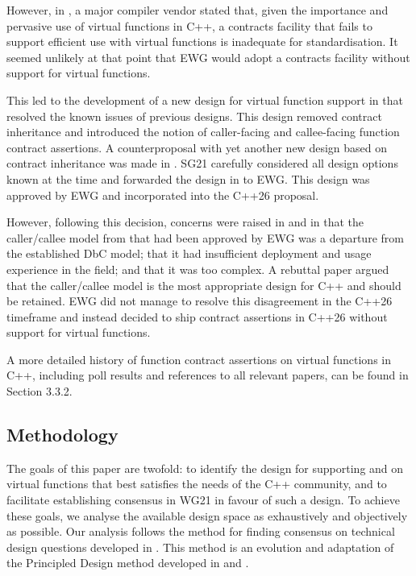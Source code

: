 However, in \cite{P3173R0}, a major compiler vendor stated that, given the importance and pervasive use of virtual functions in C++, a contracts facility that fails to support efficient use with virtual functions is inadequate for standardisation. It seemed unlikely at that point that EWG would adopt a contracts facility without support for virtual functions.

This led to the development of a new design for virtual function support in \cite{P3097R0} that resolved the known issues of previous designs. This design removed contract inheritance and introduced the notion of caller-facing and callee-facing function contract assertions. A counterproposal with yet another new design based on contract inheritance was made in \cite{P3169R0}. SG21 carefully considered all design options known at the time and forwarded the design in \cite{P3097R0} to EWG. This design was approved by EWG and incorporated into the C++26 proposal.

However, following this decision, concerns were raised in \cite{P3506R0} and in \cite{P3573R0} that the caller/callee model from \cite{P3097R0} that had been approved by EWG was a departure from the established DbC model; that it had insufficient deployment and usage experience in the field; and that it was too complex. A rebuttal paper \cite{P3506R0} argued that the caller/callee model is the most appropriate design for C++ and should be retained. EWG did not manage to resolve this disagreement in the C++26 timeframe and instead decided to ship contract assertions in C++26 without support for virtual functions.

A more detailed history of function contract assertions on virtual functions in C++, including poll results and references to all relevant papers, can be found in \cite{P2899R1} Section 3.3.2.

\subsection{Methodology}

The goals of this paper are twofold: to identify the design for supporting  and  on virtual functions that best satisfies the needs of the C++ community, and to facilitate establishing consensus in WG21 in favour of such a design. To achieve these goals, we analyse the available design space as exhaustively and objectively as possible. Our analysis follows the method for finding consensus on technical design questions developed in \cite{P3684R0}. This method is an evolution and adaptation of the Principled Design method developed in \cite{P3004R0} and \cite{P3005R0}.

